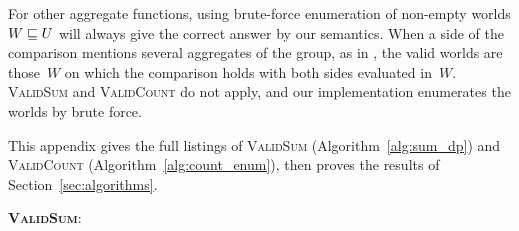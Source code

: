 For other aggregate functions, using brute-force enumeration of non-empty worlds $W\sqsubseteq\nobreak U$ will always give the correct answer by our semantics.
When a side of the comparison mentions several aggregates of the group, as in , the valid worlds are those~$W$ on which the comparison holds with both sides evaluated in~$W$. \textsc{ValidSum} and \textsc{ValidCount} do not apply, and our implementation enumerates the worlds by brute force.
\begin{toappendix}
\label{appendix:algorithms}
This appendix gives the full listings of \textsc{ValidSum}
(Algorithm~\ref{alg:sum_dp}) and \textsc{ValidCount}
(Algorithm~\ref{alg:count_enum}), then proves the results of
Section~\ref{sec:algorithms}.
\begin{algorithm}
  \small
  \caption{Enumeration of valid worlds for $(t)\op C$ at a fixed group key $\vec v$}
  \label{alg:sum_dp}

  \nlset{}\textbf{\textsc{ValidSum}}:\;

  \BlankLine
\end{algorithm}
\end{toappendix}
